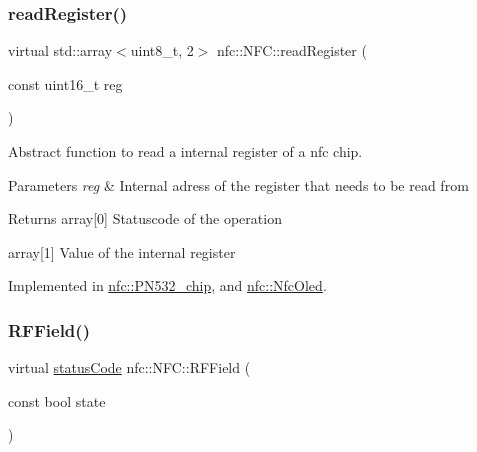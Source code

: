 \mbox{\label{classnfc_1_1NFC_a47da8428b5ee9011cc3f5e9cc501ce22}} 
\subsubsection{\texorpdfstring{read\+Register()}{readRegister()}}
{\footnotesize\ttfamily virtual std\+::array$<$uint8\+\_\+t, 2$>$ nfc\+::\+N\+F\+C\+::read\+Register (\begin{DoxyParamCaption}\item[{const uint16\+\_\+t}]{reg }\end{DoxyParamCaption})\hspace{0.3cm}{\ttfamily [pure virtual]}}



Abstract function to read a internal register of a nfc chip. 


\begin{DoxyParams}{Parameters}
{\em reg} & Internal adress of the register that needs to be read from \\
\hline
\end{DoxyParams}
\begin{DoxyReturn}{Returns}
array\mbox{[}0\mbox{]} Statuscode of the operation 

array\mbox{[}1\mbox{]} Value of the internal register 
\end{DoxyReturn}


Implemented in \hyperlink{classnfc_1_1PN532__chip_a7c3e596337bced5394689396d201bc13}{nfc\+::\+P\+N532\+\_\+chip}, and \hyperlink{classnfc_1_1NfcOled_a15c794124696c14893ffcf781609c00e}{nfc\+::\+Nfc\+Oled}.

\mbox{\label{classnfc_1_1NFC_a1179f5330aa9092aff8b1d6f984bc621}} 
\subsubsection{\texorpdfstring{R\+F\+Field()}{RFField()}}
{\footnotesize\ttfamily virtual \hyperlink{declarations_8h_ae1d20c5a38cae82ccaa6a77be3fd264b}{status\+Code} nfc\+::\+N\+F\+C\+::\+R\+F\+Field (\begin{DoxyParamCaption}\item[{const bool}]{state }\end{DoxyParamCaption})\hspace{0.3cm}{\ttfamily [pure virtual]}}



